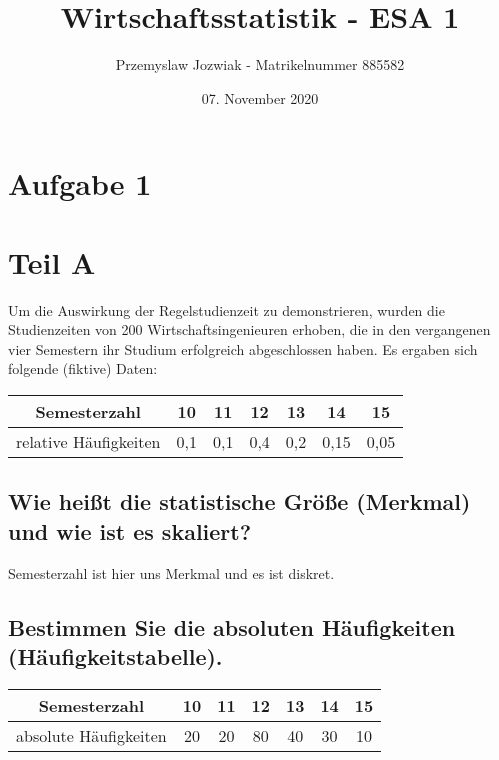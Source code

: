 \documentclass{article}
\title{Wirtschaftsstatistik - ESA 1}
\author{Przemyslaw Jozwiak - Matrikelnummer 885582}
\date{07. November 2020}
\begin{document}
\maketitle
\newpage


\section*{Aufgabe 1}
\section{Teil A}
Um die Auswirkung der Regelstudienzeit zu demonstrieren, wurden die Studienzeiten von 200 Wirtschaftsingenieuren erhoben, die in den vergangenen vier Semestern ihr Studium erfolgreich abgeschlossen haben.
Es ergaben sich folgende (fiktive) Daten:

\begin{center}
\begin{tabular}{| c | c | c | c | c | c | c | } 
\hline
Semesterzahl & 10 & 11 & 12 & 13 & 14 & 15 \\ 
\hline
relative Häufigkeiten & 0,1 & 0,1 & 0,4 & 0,2 & 0,15 & 0,05 \\ 
\hline
\end{tabular}
\end{center}

\subsection{Wie heißt die statistische Größe (Merkmal) und wie ist es skaliert?}
Semesterzahl ist hier uns Merkmal und es ist diskret.

\subsection{Bestimmen Sie die absoluten Häufigkeiten (Häufigkeitstabelle).}
\begin{center}
\begin{tabular}{| c | c | c | c | c | c | c | } 
\hline
Semesterzahl & 10 & 11 & 12 & 13 & 14 & 15 \\ 
\hline
absolute Häufigkeiten & 20 & 20 & 80 & 40 & 30 & 10 \\ 
\hline
\end{tabular}
\end{center}
\end{document}
